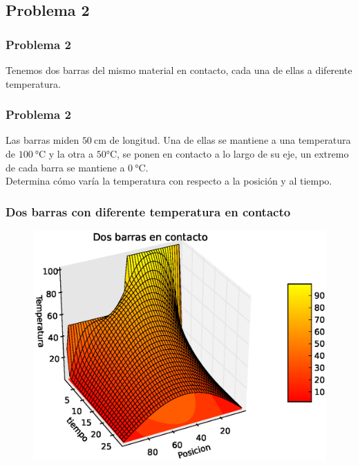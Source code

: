 \documentclass[12pt]{beamer}
\begin{document}
\subsection{Problema 2}

\begin{frame}
\frametitle{Problema 2}
Tenemos dos barras del mismo material en contacto, cada una de ellas a diferente temperatura.
\end{frame}
\begin{frame}
\frametitle{Problema 2}
Las barras miden  $50 \: \si\cm$ de longitud. Una de ellas se mantiene a una temperatura de $100 \: \si\celsius$ y la otra a $50 \si\celsius$, se ponen en contacto a lo largo de su eje, un extremo de cada barra se mantiene a $0 \: \si\celsius$.
\\
\bigskip
Determina cómo varía la temperatura con respecto a la posición y al tiempo.
\end{frame}
\begin{frame}
\frametitle{Dos barras con diferente temperatura en contacto}
\begin{figure}
	\centering
	\includegraphics[scale=0.5]{Imagenes/EqCalor06.eps}  
\end{figure}
\end{frame}
\end{document}
